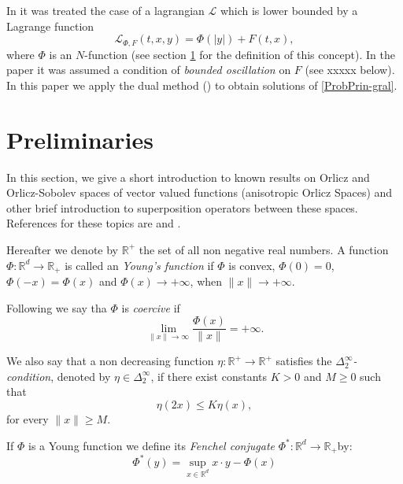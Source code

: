 \documentclass[twoside]{article}
\theoremstyle{remark}
\renewcommand{\leq}{\leqslant}
\renewcommand{\geq}{\geqslant}
\begin{document}
In \cite{ABGMS2015} it was treated  the case of a lagrangian $\mathcal{L}$ which is lower bounded by a Lagrange function
\begin{equation}\label{eq:lagrange_phi}
\mathcal{L}_{\Phi,F}(t,x,y)=\Phi(|y|)+F(t,x),
\end{equation}
where  $\Phi$ is an $N$-function (see section \ref{preliminares} for the definition of this concept).  
In the paper \cite{ABGMS2015} it was assumed  a condition of \emph{bounded oscillation} on $F$  (see xxxxx below). 
In this paper  we apply the dual method (\cite[Ch. 3]{mawhin2010critical}) to obtain solutions of \eqref{ProbPrin-gral}.



\section{Preliminaries}\label{preliminares}

In this section, we give a short introduction to known results on Orlicz and Orlicz-Sobolev spaces of vector valued functions (anisotropic Orlicz Spaces) and other brief introduction to superposition operators between these spaces. References for  these topics are \cite{Orliczvectorial2005,Skaff1969, Desch2001} and
\cite{zbMATH04038592,zbMATH04009182,zbMATH03983966,zbMATH03942215}. 

Hereafter we denote  by $\mathbb{R}^+$  the set of all non negative real numbers. A function $\Phi:\mathbb{R}^d\to \mathbb{R}_+ $ is called an \emph{Young's function} if $\Phi$ is convex, $\Phi(0)=0$, $\Phi(-x)=\Phi(x)$ and $\Phi(x)\to +\infty$, when $\|x\|\to+\infty$.

Following \cite{Orliczvectorial2005} we say tha $\Phi$ is \emph{coercive} if
\[\lim_{\|x\|\to\infty}\frac{\Phi(x)}{\|x\|}=+\infty.\]

We also say that a non decreasing function $\eta:\mathbb{R}^+\rightarrow \mathbb{R}^+$ satisfies the  \emph{$\Delta_2^{\infty}$-condition}, denoted by $\eta \in \Delta_2^{\infty}$,
if there exist  constants $K>0$ and  $M\geq 0$ such that
\begin{equation}\label{delta2defi}\eta(2x)\leq K\eta(x),
\end{equation}
for every $\|x\|\geq M$.


If $\Phi$ is a Young function we define its \emph{Fenchel conjugate}   $\Phi^*:\mathbb{R}^d\to \mathbb{R}_+ $by:
\begin{equation}\label{eq:conjugada}
 \Phi^*(y)=\sup\limits_{x\in\mathbb{R}^d} x\cdot y-\Phi(x)
\end{equation}
\end{document}
